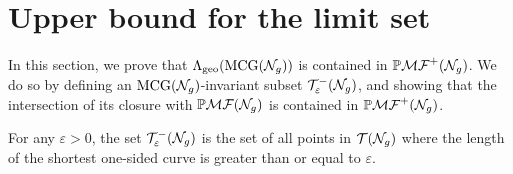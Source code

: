 \documentclass[12pt, reqno]{amsart}
\begin{document}
\section{Upper bound for the limit set}
\label{sec:upper-bound-limit-set}

In this section, we prove that $\Lambda_{\mathrm{geo}}(\mathrm{MCG}(\mathcal{N}_g))$ is contained in $\mathbb{P}\mathcal{MF}^+(\mathcal{N}_g)$.
We do so by defining an $\mathrm{MCG}(\mathcal{N}_g)$-invariant subset $\mathcal{T}_{\varepsilon}^{-}(\mathcal{N}_g)$, and showing that the intersection of its closure with $\mathbb{P}\mathcal{MF}(\mathcal{N}_g)$ is contained in $\mathbb{P}\mathcal{MF}^+(\mathcal{N}_g)$.

\begin{definition}
  For any $\varepsilon > 0$, the set $\mathcal{T}_{\varepsilon}^{-}(\mathcal{N}_g)$ is the set of all points in $\mathcal{T}(\mathcal{N}_g)$ where the length of the shortest one-sided curve is greater than or equal to $\varepsilon$.
\end{definition}
\end{document}
